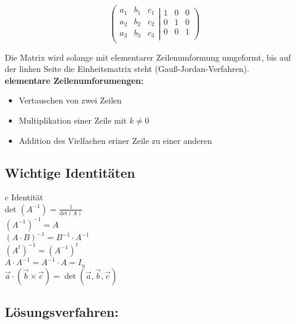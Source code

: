 \[\left (
    \begin{array}{rrr}
        a_1 & b_1 & c_1 \\
        a_2 & b_2 & c_2 \\
        a_3 & b_3 & c_3 \\
    \end{array}
    \right .
    \left |
    \begin{array}{rrr}
        1 & 0 & 0 \\ 
        0 & 1 & 0 \\
        0 & 0 & 1 \\ 
    \end{array} \right )\]

Die Matrix wird solange mit elementarer Zeilenumformung umgeformt, bis auf der linken Seite die Einheitsmatrix steht (Gauß-Jordan-Verfahren). \\

\textbf{elementare Zeilenumforumengen:}  
\begin{itemize}
    \item Vertauschen von zwei Zeilen
    \item Multiplikation einer Zeile mit $k \neq 0$
    \item Addition des Vielfachen eriner Zeile zu einer anderen
\end{itemize}



\subsection{Wichtige Identitäten}
\begin{center}
    \begin{tblr}{c}
        Identität \\ \hline[1.5pt]
        det $(A^{-1})= \frac{1}{\text{det}(A)}$\\ \hline
        $(A^{-1})^{-1} = A$ \\ \hline
        $(A\cdot B)^{-1}=B^{-1}\cdot A^{-1}$ \\ \hline 
        $(A^t)^{-1}=(A^{-1})^t$ \\ \hline
        $A\cdot A^{-1}=A^{-1}\cdot A=I_n$ \\ \hline 
        $\vec{a}\cdot (\vec{b}\times \vec{c})=\det(\vec{a}, \vec{b}, \vec{c})$\\ \hline
    \end{tblr}
\end{center}



\subsection{Lösungsverfahren:}
